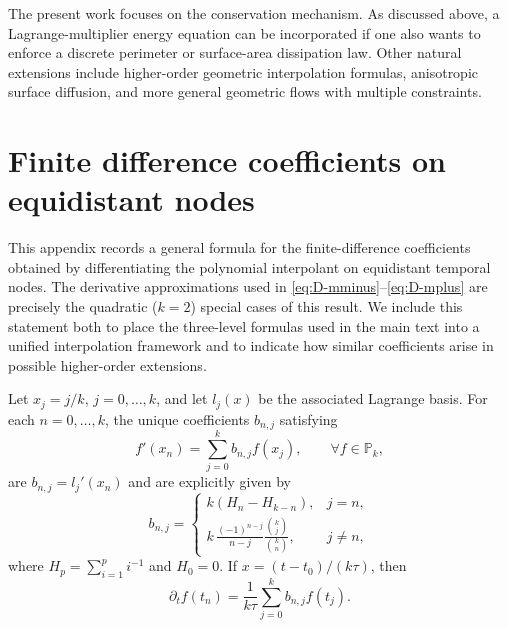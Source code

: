 \documentclass[smallextended]{svjour3}
\numberwithin{equation}{section}
\begin{document}
	The present work focuses on the conservation mechanism. As discussed above, a Lagrange-multiplier energy equation can be incorporated if one also wants to enforce a discrete perimeter or surface-area dissipation law. Other natural extensions include higher-order geometric interpolation formulas, anisotropic surface diffusion, and more general geometric flows with multiple constraints.
	
	
	\appendix
	
	
	\section{Finite difference coefficients on equidistant nodes}
	\label{app:fd-coeff}
	This appendix records a general formula for the finite-difference coefficients obtained by differentiating the polynomial interpolant on equidistant temporal nodes. The derivative approximations used in \eqref{eq:D-mminus}--\eqref{eq:D-mplus} are precisely the quadratic ($k=2$) special cases of this result. We include this statement both to place the three-level formulas used in the main text into a unified interpolation framework and to indicate how similar coefficients arise in possible higher-order extensions.
	\begin{theorem}
		Let $x_j=j/k$, $j=0,\ldots,k$, and let $l_j(x)$ be the associated Lagrange basis. For each $n=0,\ldots,k$, the unique coefficients $b_{n,j}$ satisfying
		\[
		f'(x_n)=\sum_{j=0}^{k} b_{n,j}f(x_j),
		\qquad \forall f\in\mathbb{P}_k,
		\]
		are $b_{n,j}=l_j'(x_n)$ and are explicitly given by
		\[
		b_{n,j}=
		\begin{cases}
			\displaystyle k\left(H_n-H_{k-n}\right),& j=n,\\[1ex]
			\displaystyle k\,\frac{(-1)^{n-j}}{n-j}\frac{\binom{k}{j}}{\binom{k}{n}},& j\ne n,
		\end{cases}
		\]
		where $H_p=\sum_{i=1}^p i^{-1}$ and $H_0=0$. If $x=(t-t_0)/(k\tau)$, then
		\[
		\partial_t f(t_n)
		=
		\frac{1}{k\tau}
		\sum_{j=0}^{k}b_{n,j}f(t_j).
		\]
	\end{theorem}
	
\end{document}
